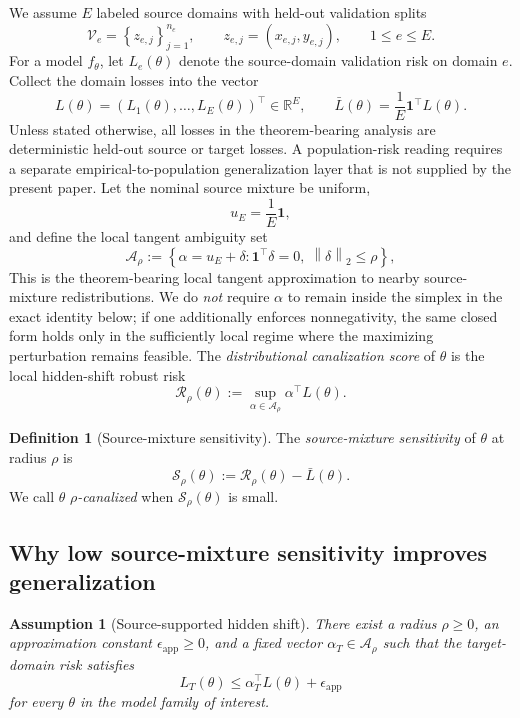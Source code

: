 \documentclass{article}
\newtheorem{assumption}[theorem]{Assumption}
\theoremstyle{definition}
\newtheorem{definition}[theorem]{Definition}
\newcommand{\RR}{\mathbb{R}}
\newcommand{\cA}{\mathcal{A}}
\newcommand{\cV}{\mathcal{V}}
\newcommand{\one}{\mathbf{1}}
\newcommand{\norm}[1]{\left\lVert #1 \right\rVert}
\newcommand{\paren}[1]{\left( #1 \right)}
\newcommand{\braces}[1]{\left\{ #1 \right\}}
\newcommand{\ub}{u_E}
\begin{document}
We assume \(E\) labeled source domains with held-out validation splits
\[
\cV_e = \braces{z_{e,j}}_{j=1}^{n_e},
\qquad
z_{e,j}=(x_{e,j}, y_{e,j}),
\qquad
1 \le e \le E.
\]
For a model \(f_\theta\), let \(L_e(\theta)\) denote the source-domain validation risk on domain \(e\). Collect the domain losses into the vector
\[
L(\theta) = \paren{L_1(\theta),\dots,L_E(\theta)}^\top \in \RR^E,
\qquad
\bar L(\theta)=\frac{1}{E}\one^\top L(\theta).
\]
Unless stated otherwise, all losses in the theorem-bearing analysis are deterministic held-out source or target losses. A population-risk reading requires a separate empirical-to-population generalization layer that is not supplied by the present paper.
Let the nominal source mixture be uniform,
\[
\ub = \frac{1}{E}\one,
\]
and define the local tangent ambiguity set
\begin{equation}
\cA_\rho
:=
\braces{
\alpha=\ub+\delta :
\one^\top\delta=0,
\;
\norm{\delta}_2 \le \rho
},
\label{eq:ambiguity}
\end{equation}
This is the theorem-bearing local tangent approximation to nearby source-mixture redistributions. We do \emph{not} require \(\alpha\) to remain inside the simplex in the exact identity below; if one additionally enforces nonnegativity, the same closed form holds only in the sufficiently local regime where the maximizing perturbation remains feasible.
The \emph{distributional canalization score} of \(\theta\) is the local hidden-shift robust risk
\begin{equation}
\mathcal R_\rho(\theta)
:=
\sup_{\alpha\in \cA_\rho}
\alpha^\top L(\theta).
\label{eq:model_robust_risk}
\end{equation}

\begin{definition}[Source-mixture sensitivity]
\label{def:sensitivity}
The \emph{source-mixture sensitivity} of \(\theta\) at radius \(\rho\) is
\begin{equation}
\mathcal S_\rho(\theta)
:=
\mathcal R_\rho(\theta)-\bar L(\theta).
\label{eq:sensitivity}
\end{equation}
We call \(\theta\) \emph{\(\rho\)-canalized} when \(\mathcal S_\rho(\theta)\) is small.
\end{definition}

\subsection{Why low source-mixture sensitivity improves generalization}

\begin{assumption}[Source-supported hidden shift]
\label{ass:source_supported}
There exist a radius \(\rho\ge 0\), an approximation constant \(\epsilon_{\mathrm{app}}\ge 0\), and a fixed vector \(\alpha_T \in \cA_\rho\) such that the target-domain risk satisfies
\begin{equation}
L_T(\theta)
\le
\alpha_T^\top L(\theta) + \epsilon_{\mathrm{app}}
\label{eq:source_supported}
\end{equation}
for every \(\theta\) in the model family of interest.
\end{assumption}
\end{document}
